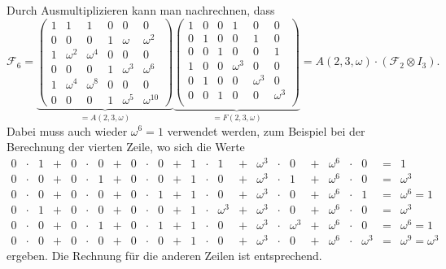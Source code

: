 Durch Ausmultiplizieren kann man nachrechnen, dass
\[
\mathscr{F}_6
=
\underbrace{
\left(\begin{array}{ccc|ccc}
1&       1&       1&      0&       0&          0\\
0&       0&       0&      1&\omega  &   \omega^2\\
\hline
1&\omega^2&\omega^4&      0&       0&          0\\
0&       0&       0&      1&\omega^3&   \omega^6\\
\hline
1&\omega^4&\omega^8&      0&       0&          0\\
0&       0&       0&      1&\omega^5&\omega^{10}
\end{array}\right)
}_{\displaystyle =A(2,3,\omega)}
\underbrace{
\left(\begin{array}{ccc|ccc}
1&0&0&       1&       0&       0\\
0&1&0&       0&       1&       0\\
0&0&1&       0&       0&       1\\
\hline
1&0&0&\omega^3&       0&       0\\
0&1&0&       0&\omega^3&       0\\
0&0&1&       0&       0&\omega^3\\
\end{array}\right)
}_{\displaystyle =F(2,3,\omega)}
=
A(2,3,\omega)
\cdot
(\mathscr{F}_2\otimes I_3).
\]
Dabei muss auch wieder $\omega^6=1$ verwendet werden, zum Beispiel
bei der Berechnung der vierten Zeile, wo sich die Werte
\[
\renewcommand\arraycolsep{2pt}
\begin{array}{rclcrclcrclcrclcrclcrclcl}
0&\cdot&1 &+& 0&\cdot&0 &+& 0&\cdot&0 &+& 1&\cdot&1 &+& \omega^3&\cdot&0 &+& \omega^6&\cdot&0 &=& 1 \\
0&\cdot&0 &+& 0&\cdot&1 &+& 0&\cdot&0 &+& 1&\cdot&0 &+& \omega^3&\cdot&1 &+& \omega^6&\cdot&0 &=& \omega^3 \\
0&\cdot&0 &+& 0&\cdot&0 &+& 0&\cdot&1 &+& 1&\cdot&0 &+& \omega^3&\cdot&0 &+& \omega^6&\cdot&1 &=& \omega^6 = 1 \\
0&\cdot&1 &+& 0&\cdot&0 &+& 0&\cdot&0 &+& 1&\cdot&\omega^3 &+& \omega^3&\cdot&0 &+& \omega^6&\cdot&0 &=& \omega^3 \\
0&\cdot&0 &+& 0&\cdot&1 &+& 0&\cdot&1 &+& 1&\cdot&0 &+& \omega^3&\cdot&\omega^3 &+& \omega^6&\cdot&0 &=& \omega^6=1 \\
0&\cdot&0 &+& 0&\cdot&0 &+& 0&\cdot&0 &+& 1&\cdot&0 &+& \omega^3&\cdot&0 &+& \omega^6&\cdot&\omega^3 &=& \omega^9=\omega^3 
\end{array}
\]
ergeben.
Die Rechnung für die anderen Zeilen ist entsprechend.

